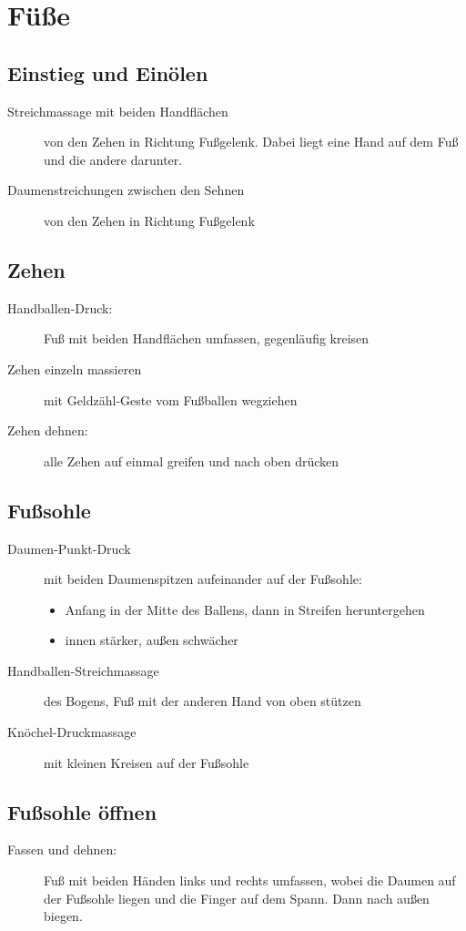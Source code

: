 \section{Füße}
\enlargethispage{2em}

\subsection{Einstieg und Einölen}
\begin{description}
  \item[Streichmassage mit beiden Handflächen] von den Zehen in Richtung Fußgelenk. Dabei liegt eine Hand auf dem Fuß und die andere darunter.
  \item[Daumenstreichungen zwischen den Sehnen] von den Zehen in Richtung Fußgelenk
\end{description}

\subsection{Zehen}
\begin{description}
  \item[Handballen-Druck:] Fuß mit beiden Handflächen umfassen, gegenläufig kreisen
  \item[Zehen einzeln massieren] mit Geldzähl-Geste vom Fußballen wegziehen
  \item[Zehen dehnen:] alle Zehen auf einmal greifen und nach oben drücken
\end{description}

\subsection{Fußsohle}
\begin{description}
\item[Daumen-Punkt-Druck] mit beiden Daumenspitzen aufeinander auf der Fußsohle:
  \begin{itemize}
    \item Anfang in der Mitte des Ballens, dann in Streifen heruntergehen
    \item innen stärker, außen schwächer
  \end{itemize}
\item[Handballen-Streichmassage] des Bogens, Fuß mit der anderen Hand von oben stützen
\item[Knöchel-Druckmassage] mit kleinen Kreisen auf der Fußsohle
\end{description}

\subsection{Fußsohle öffnen}
\begin{description}
  \item[Fassen und dehnen:] Fuß mit beiden Händen links und rechts umfassen, wobei die Daumen auf der Fußsohle liegen und die Finger auf dem Spann. Dann nach außen biegen.
\end{description}

